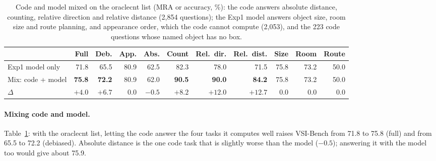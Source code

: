 \begin{table}[h]
\centering
\caption{Code and model mixed on the oraclecnt list (MRA or accuracy, \%): the code answers absolute distance,
counting, relative direction and relative distance (2,854 questions); the Exp1 model answers object size, room size and
route planning, and appearance order, which the code cannot compute (2,053), and the 223 code questions whose named object
has no box.}
\label{tab:agent-code-mix}
\small
\setlength{\tabcolsep}{4pt}
\begin{tabular}{lrrrrrrrrrr}
\toprule
 & Full & Deb. & App. & Abs. & Count & Rel.\ dir. & Rel.\ dist. & Size & Room & Route \\
\midrule
Exp1 model only         & 71.8 & 65.5 & 80.9 & 62.5 & 82.3 & 78.0 & 71.5 & 75.8 & 73.2 & 50.0 \\
Mix: code + model       & \textbf{75.8} & \textbf{72.2} & 80.9 & 62.0 & \textbf{90.5} & \textbf{90.0} & \textbf{84.2} & 75.8 & 73.2 & 50.0 \\
$\Delta$                & $+4.0$ & $+6.7$ & $0.0$ & $-0.5$ & $+8.2$ & $+12.0$ & $+12.7$ & $0.0$ & $0.0$ & $0.0$ \\
\bottomrule
\end{tabular}
\end{table}

\paragraph{Mixing code and model.}
Table~\ref{tab:agent-code-mix}: with the oraclecnt list, letting the code answer the four tasks it computes well raises
VSI-Bench from 71.8 to 75.8 (full) and from 65.5 to 72.2 (debiased). Absolute distance is the one code task that is
slightly worse than the model ($-0.5$); answering it with the model too would give about 75.9.

